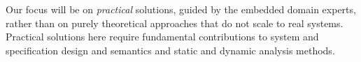 Our focus will be on \emph{practical} solutions, guided by the
embedded domain experts, rather than on purely theoretical approaches
that do not scale to real systems. Practical solutions here require
fundamental contributions to system and specification design and
semantics and static and dynamic analysis methods.